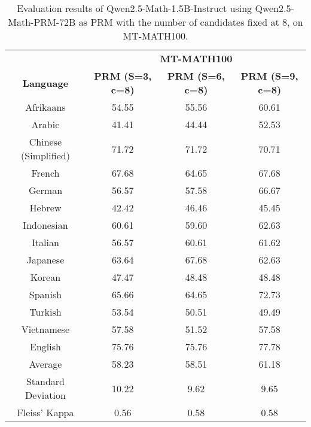 \begin{table*}[]
\centering
\fontsize{10}{13} \selectfont
\begin{tabular}{c|c|c|c}
\toprule
 & \multicolumn{3}{c}{\textbf{MT-MATH100}} \\ \cmidrule{2-4}
\multirow{-2}{*}{\textbf{Language}} & \multicolumn{1}{c|}{\textbf{PRM (S=3, c=8)}} & \multicolumn{1}{c|}{\textbf{PRM (S=6, c=8)}} & \multicolumn{1}{c|}{\textbf{PRM (S=9, c=8)}} \\ \midrule
Afrikaans & 54.55 & 55.56 & 60.61 \\
Arabic & 41.41 & 44.44 & 52.53 \\
Chinese (Simplified) & 71.72 & 71.72 & 70.71 \\
French & 67.68 & 64.65 & 67.68 \\
German & 56.57 & 57.58 & 66.67 \\
Hebrew & 42.42 & 46.46 & 45.45 \\
Indonesian & 60.61 & 59.60 & 62.63 \\
Italian & 56.57 & 60.61 & 61.62 \\
Japanese & 63.64 & 67.68 & 62.63 \\
Korean & 47.47 & 48.48 & 48.48 \\
Spanish & 65.66 & 64.65 & 72.73 \\
Turkish & 53.54 & 50.51 & 49.49 \\
Vietnamese & 57.58 & 51.52 & 57.58 \\
\rowcolor[HTML]{FCE5CD} 
English & 75.76 & 75.76 & 77.78 \\ \midrule
Average & 58.23 & 58.51 & 61.18 \\
Standard Deviation & 10.22 & 9.62 & 9.65 \\
Fleiss' Kappa & 0.56 & 0.58 & 0.58 \\ \bottomrule
\end{tabular}
\caption{\footnotesize Evaluation results of Qwen2.5-Math-1.5B-Instruct using Qwen2.5-Math-PRM-72B as PRM with the number of candidates fixed at 8, on MT-MATH100.}
\label{tab:1_5B_prm_72B_c8}
\end{table*}

